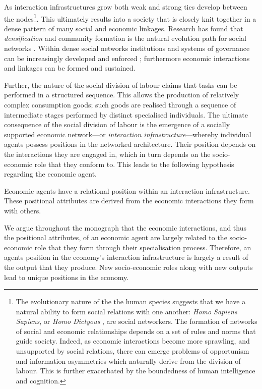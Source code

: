 As interaction infrastructures grow both weak and strong ties develop between the nodes\footnote{The evolutionary nature of the the human species suggests that we have a natural ability to form social relations with one another: \emph{Homo Sapiens Sapiens}, or \emph{Homo Dictyous} \citep{ChristakisFowler2009}, are social networkers. The formation of networks of social and economic relationships depends on a set of rules and norms that guide society. Indeed, as economic interactions become more sprawling, and unsupported by social relations, there can emerge problems of opportunism and information asymmetries which naturally derive from the division of labour. This is further exacerbated by the boundedness of human intelligence and cognition.}. This ultimately results into a society that is closely knit together in a dense pattern of many social and economic linkages. Research has found that \emph{densification} and community formation is the natural evolution path for social networks \citep{Leskovec2005a, Leskovec2007a, Leskovec2008}. Within dense social networks institutions and systems of governance can be increasingly developed and enforced \citep{North1989, North1990}; furthermore economic interactions and linkages can be formed and sustained.

Further, the nature of the social division of labour claims that tasks can be performed in a structured sequence. This allows the production of relatively complex consumption goods; such goods are realised through a sequence of intermediate stages performed by distinct specialised individuals. The ultimate consequence of the social division of labour is the emergence of a socially supported economic network---or \emph{interaction infrastructure}---whereby individual agents possess positions in the networked architecture. Their position depends on the interactions they are engaged in, which in turn depends on the socio-economic role that they conform to. This leads to the following hypothesis regarding the economic agent.

\begin{lemma} \label{con:positionalattributes}
Economic agents have a relational position within an interaction infrastructure. These positional attributes are derived from the economic interactions they form with others.
\end{lemma}

We argue throughout the monograph that the economic interactions, and thus the positional attributes, of an economic agent are largely related to the socio-economic role that they form through their specialisation process. Therefore, an agents position in the economy's interaction infrastructure is largely a result of the output that they produce. New socio-economic roles along with new outputs lead to unique positions in the economy.

